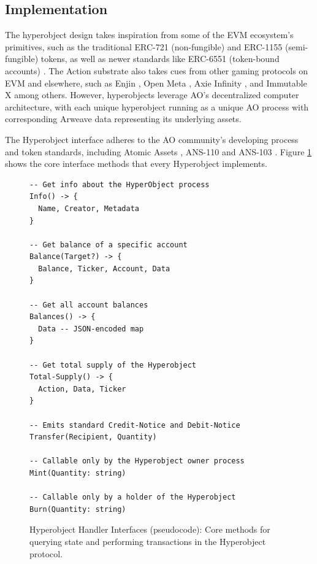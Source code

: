 \subsection{Implementation}

The hyperobject design takes inspiration from some of the EVM ecosystem's primitives, such as the traditional ERC-721 (non-fungible) \cite{Entriken2018} and ERC-1155 (semi-fungible) \cite{Radomski2018} tokens, as well as newer standards like ERC-6551 (token-bound accounts) \cite{Windle2023}. The Action substrate also takes cues from other gaming protocols on EVM and elsewhere, such as Enjin \cite{Blagov2023}, Open Meta \cite{Gill2024}, Axie Infinity \cite{Nguyen2020}, and Immutable X \cite{Ferguson2021} among others. However, hyperobjects leverage AO's decentralized computer architecture, with each unique hyperobject running as a unique AO process with corresponding Arweave data representing its underlying assets. \cite{AtomicAsset}

The Hyperobject interface adheres to the AO community's developing process and token standards, including Atomic Assets \cite{AtomicAssetsSpec2024}, ANS-110 \cite{ANS110_2024} and ANS-103 \cite{ANS103_2024}. Figure \ref{fig:hyperobject_interface} shows the core interface methods that every Hyperobject implements.

\begin{figure}[t]
\begin{lstlisting}[basicstyle=\ttfamily\small]
-- Get info about the HyperObject process
Info() -> {
  Name, Creator, Metadata
}

-- Get balance of a specific account
Balance(Target?) -> {
  Balance, Ticker, Account, Data
}

-- Get all account balances
Balances() -> {
  Data -- JSON-encoded map
}

-- Get total supply of the Hyperobject
Total-Supply() -> {
  Action, Data, Ticker
}

-- Emits standard Credit-Notice and Debit-Notice
Transfer(Recipient, Quantity)

-- Callable only by the Hyperobject owner process
Mint(Quantity: string)

-- Callable only by a holder of the Hyperobject
Burn(Quantity: string)
\end{lstlisting}
\caption{Hyperobject Handler Interfaces (pseudocode): Core methods for querying state and performing transactions in the Hyperobject protocol.}
\label{fig:hyperobject_interface}
\end{figure}

